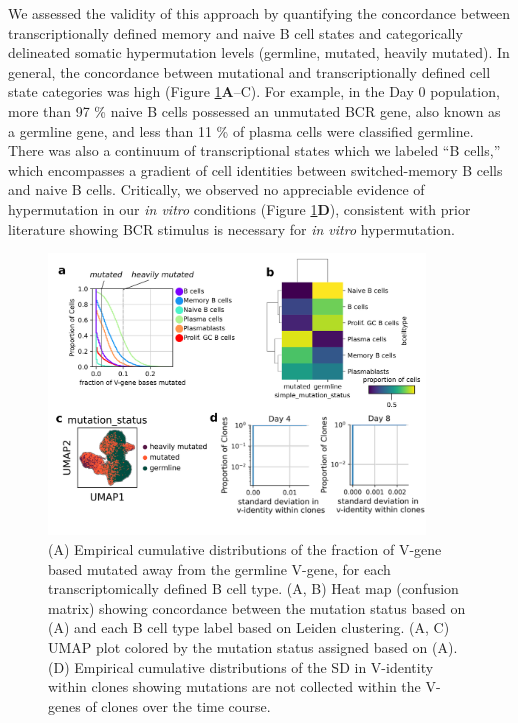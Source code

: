 We assessed the validity of this approach by quantifying the concordance between transcriptionally defined memory and naive B cell states and categorically delineated somatic hypermutation levels (germline, mutated, heavily mutated). In general, the concordance between mutational and transcriptionally defined cell state categories was high (Figure \ref{fig:paper2_fig_s2}\textbf{A}–C). For example, in the Day 0 population, more than 97 \% naive B cells possessed an unmutated BCR gene, also known as a germline gene, and less than 11 \% of plasma cells were classified germline. There was also a continuum of transcriptional states which we labeled “B cells,” which encompasses a gradient of cell identities between switched-memory B cells and naive B cells. Critically, we observed no appreciable evidence of hypermutation in our \textit{in vitro} conditions (Figure \ref{fig:paper2_fig_s2}\textbf{D}), consistent with prior literature showing BCR stimulus is necessary for \textit{in vitro} hypermutation\cite{bergthorsdottir_signals_2001}.

\begin{figure}[hbt!]
\centering
\includegraphics[width=10cm, keepaspectratio]{figs/InVitro/figS2_bcd.png}
\caption[Validation of population based lineage inference.]{(A) Empirical cumulative distributions of the fraction of V-gene based mutated away from the germline V-gene, for each transcriptomically defined B cell type. (A, B) Heat map (confusion matrix) showing concordance between the mutation status based on (A) and each B cell type label based on Leiden clustering. (A, C) UMAP plot colored by the mutation status assigned based on (A). (D) Empirical cumulative distributions of the SD in V-identity within clones showing mutations are not collected within the V-genes of clones over the time course.}
\label{fig:paper2_fig_s2}
\end{figure}

